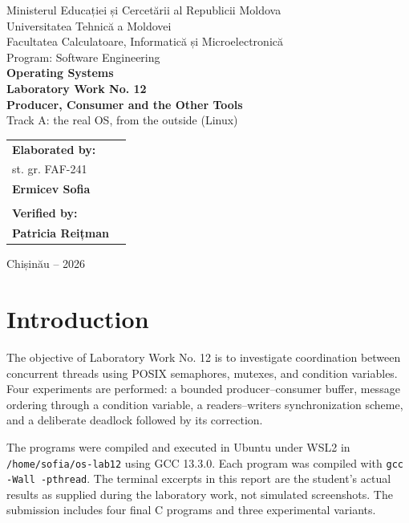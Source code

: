 \documentclass[12pt,a4paper]{article}
\begin{document}
\begin{titlepage}
\begin{center}
{\large Ministerul Educației și Cercetării al Republicii Moldova}\\[0.3cm]
{\large Universitatea Tehnică a Moldovei}\\[0.3cm]
{\large Facultatea Calculatoare, Informatică și Microelectronică}\\[0.3cm]
{\large Program: Software Engineering}\\[2.3cm]
{\Large\textbf{Operating Systems}}\\[0.8cm]
{\LARGE\textbf{Laboratory Work No. 12}}\\[0.5cm]
{\Large\textbf{Producer, Consumer and the Other Tools}}\\[0.35cm]
{\large Track A: the real OS, from the outside (Linux)}
\vfill
\begin{flushright}
\begin{tabular}{ll}
\textbf{Elaborated by:} & \\
st. gr. FAF-241 & \\
\textbf{Ermicev Sofia} & \\
\\
\textbf{Verified by:} & \\
\textbf{Patricia Reițman} &
\end{tabular}
\end{flushright}
\vfill
{\large Chișinău -- 2026}
\end{center}
\end{titlepage}
\tableofcontents
\newpage

\section{Introduction}
The objective of Laboratory Work No. 12 is to investigate coordination between concurrent threads using POSIX semaphores, mutexes, and condition variables. Four experiments are performed: a bounded producer--consumer buffer, message ordering through a condition variable, a readers--writers synchronization scheme, and a deliberate deadlock followed by its correction.

The programs were compiled and executed in Ubuntu under WSL2 in \texttt{/home/sofia/os-lab12} using GCC 13.3.0. Each program was compiled with \texttt{gcc -Wall -pthread}. The terminal excerpts in this report are the student's actual results as supplied during the laboratory work, not simulated screenshots. The submission includes four final C programs and three experimental variants.
\end{document}
